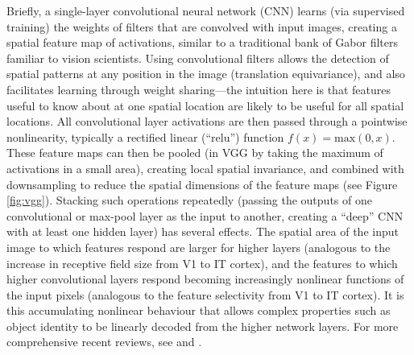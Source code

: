 \documentclass[doc, 11pt,a4paper,natbib]{apa6}\usepackage[]{graphicx}\usepackage[]{color}
\begin{document}
Briefly, a single-layer convolutional neural network (CNN) learns (via supervised training) the weights of filters that are convolved with input images, creating a spatial feature map of activations, similar to a traditional bank of Gabor filters familiar to vision scientists.
Using convolutional filters allows the detection of spatial patterns at any position in the image (translation equivariance), and also facilitates learning through weight sharing---the intuition here is that features useful to know about at one spatial location are likely to be useful for all spatial locations.
All convolutional layer activations are then passed through a pointwise nonlinearity, typically a rectified linear (``relu'') function $f(x) = \mathrm{max}(0, x)$.
These feature maps can then be pooled (in VGG by taking the maximum of activations in a small area), creating local spatial invariance, and combined with downsampling to reduce the spatial dimensions of the feature maps (see Figure \ref{fig:vgg}).
Stacking such operations repeatedly (passing the outputs of one convolutional or max-pool layer as the input to another, creating a ``deep'' CNN with at least one hidden layer) has several effects. 
The spatial area of the input image to which features respond are larger for higher layers (analogous to the increase in receptive field size from V1 to IT cortex), and the features to which higher convolutional layers respond becoming increasingly nonlinear functions of the input pixels (analogous to the feature selectivity from V1 to IT cortex).
It is this accumulating nonlinear behaviour that allows complex properties such as object identity \citep[and many other properties;][]{hong_explicit_2016} to be linearly decoded from the higher network layers.
For more comprehensive recent reviews, see \citet{lecun_deep_2015, kietzmann_deep_2017} and \citet{yamins_using_2016}.
\end{document}
